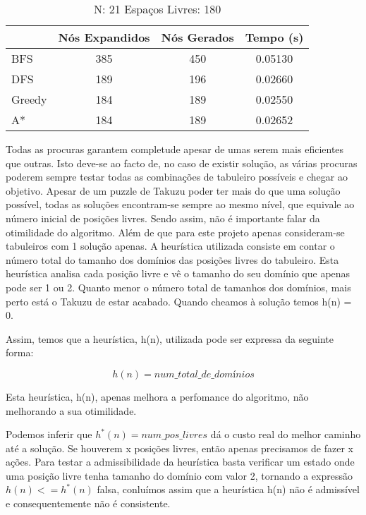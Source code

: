 \documentclass[12pt,a4paper]{article}
\begin{document}
  \begin{table}[H]
    \caption{N: 21 Espaços Livres: 180}
    \label{tab:my-table3}
    \centering
    \begin{tabular}{lccc}
      & Nós Expandidos & Nós Gerados & Tempo (s) \\
      \hline
      BFS    & 385 & 450 & 0.05130 \\
      DFS    & 189 & 196 & 0.02660 \\
      Greedy & 184 & 189 & 0.02550 \\
      A*     & 184 & 189 & 0.02652 \\
    \hline
    \end{tabular}
  \end{table}
  
  Todas as procuras garantem completude apesar de umas serem mais eficientes que outras. Isto deve-se ao facto de, no caso de existir solução, as várias procuras poderem sempre testar todas as combinações de tabuleiro possíveis e chegar ao objetivo.
  Apesar de um puzzle de Takuzu poder ter mais do que uma solução possível, todas as soluções encontram-se sempre ao mesmo nível, que equivale ao número inicial de posições livres. Sendo assim, não é importante falar da otimilidade do algoritmo.
  Além de que para este projeto apenas consideram-se tabuleiros com 1 solução apenas.
  A heurística utilizada consiste em contar o número total do tamanho dos domínios das posições livres do tabuleiro.
  Esta heurística analisa cada posição livre e vê o tamanho do seu domínio que apenas pode ser 1 ou 2.
  Quanto menor o número total de tamanhos dos domínios, mais perto está o Takuzu de estar acabado.
  Quando cheamos à solução temos h(n) = 0.
  
  Assim, temos que a heurística, h(n), utilizada pode ser expressa da seguinte forma:
  
  $$
  h(n) = num\_total\_de\_domínios
  $$

  
  Esta heurística, h(n), apenas melhora a perfomance do algoritmo, não melhorando a sua otimilidade.

  Podemos inferir que $h^*(n) = num\_pos\_livres$ dá o custo real do melhor caminho até a solução. Se houverem x posições livres, então apenas precisamos de fazer x ações.
  Para testar a admissibilidade da heurística basta verificar um estado onde uma posição livre tenha tamanho do domínio com valor 2, tornando a expressão $h(n) <= h^*(n)$ falsa,
  conluímos assim que a heurística h(n) não é admissível e consequentemente não é consistente.
\end{document}
